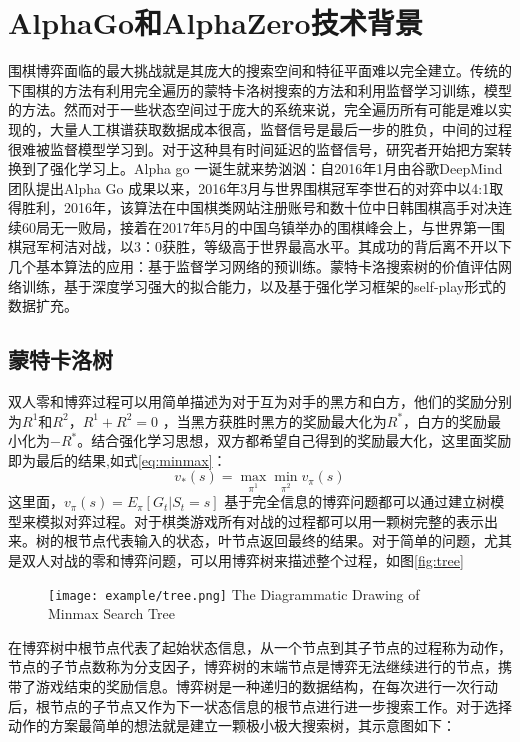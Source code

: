 \section{AlphaGo和AlphaZero技术背景}
围棋博弈面临的最大挑战就是其庞大的搜索空间和特征平面难以完全建立。传统的下围棋的方法有利用完全遍历的蒙特卡洛树搜索的方法和利用监督学习训练，模型的方法。然而对于一些状态空间过于庞大的系统来说，完全遍历所有可能是难以实现的，大量人工棋谱获取数据成本很高，监督信号是最后一步的胜负，中间的过程很难被监督模型学习到。对于这种具有时间延迟的监督信号，研究者开始把方案转换到了强化学习上。Alpha go 一诞生就来势汹汹：自2016年1月由谷歌DeepMind团队提出Alpha Go 成果以来，2016年3月与世界围棋冠军李世石的对弈中以4:1取得胜利，2016年，该算法在中国棋类网站注册账号和数十位中日韩围棋高手对决连续60局无一败局，接着在2017年5月的中国乌镇举办的围棋峰会上，与世界第一围棋冠军柯洁对战，以3：0获胜，等级高于世界最高水平。其成功的背后离不开以下几个基本算法的应用：基于监督学习网络的预训练。蒙特卡洛搜索树的价值评估网络训练，基于深度学习强大的拟合能力，以及基于强化学习框架的self-play形式的数据扩充。
\subsection{蒙特卡洛树}
双人零和博弈过程可以用简单描述为对于互为对手的黑方和白方，他们的奖励分别为$R^1$和$R^2$，$R^1+R^2=0$ ，当黑方获胜时黑方的奖励最大化为$R^*$，白方的奖励最小化为$-R^*$。结合强化学习思想，双方都希望自己得到的奖励最大化，这里面奖励即为最后的结果,如式\ref{eq:minmax}：
\begin{equation}
\label{eq:minmax}
{v_*}(s) = \mathop {\max }\limits_{{\pi ^1}} \mathop {\min }\limits_{{\pi ^2}} {v_\pi }(s)
\end{equation}
这里面，${v_\pi }(s) = {E_\pi }[{G_t}|{S_t} = s]$
基于完全信息的博弈问题都可以通过建立树模型来模拟对弈过程。对于棋类游戏所有对战的过程都可以用一颗树完整的表示出来。树的根节点代表输入的状态，叶节点返回最终的结果。对于简单的问题，尤其是双人对战的零和博弈问题，可以用博弈树来描述整个过程，如图\ref{fig:tree}
\begin{figure}[!htp]
	\centering
	\texttt{[image: example/tree.png]}
	{The Diagrammatic Drawing of Minmax Search Tree}
	\label{tree}
\end{figure}

在博弈树中根节点代表了起始状态信息，从一个节点到其子节点的过程称为动作，节点的子节点数称为分支因子，博弈树的末端节点是博弈无法继续进行的节点，携带了游戏结束的奖励信息。博弈树是一种递归的数据结构，在每次进行一次行动后，根节点的子节点又作为下一状态信息的根节点进行进一步搜索工作。对于选择动作的方案最简单的想法就是建立一颗极小极大搜索树，其示意图如下：

